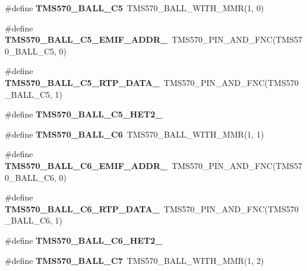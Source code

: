 \begin{DoxyCompactItemize}
\mbox{\label{tms570lc4357-pins_8h_a68cd49c5fae726ad359edde2b38d04a6}} 
\#define {\bfseries T\+M\+S570\+\_\+\+B\+A\+L\+L\+\_\+\+C5}~T\+M\+S570\+\_\+\+B\+A\+L\+L\+\_\+\+W\+I\+T\+H\+\_\+\+M\+MR(1, 0)
\item 
\mbox{\label{tms570lc4357-pins_8h_a28c8b32b66ef366222d24f74ae7975b2}} 
\#define {\bfseries T\+M\+S570\+\_\+\+B\+A\+L\+L\+\_\+\+C5\+\_\+\+E\+M\+I\+F\+\_\+\+A\+D\+D\+R\+\_}~T\+M\+S570\+\_\+\+P\+I\+N\+\_\+\+A\+N\+D\+\_\+\+F\+NC(T\+M\+S570\+\_\+\+B\+A\+L\+L\+\_\+\+C5, 0)
\item 
\mbox{\label{tms570lc4357-pins_8h_a885ec0b43a04a072986ee2cb57c57e17}} 
\#define {\bfseries T\+M\+S570\+\_\+\+B\+A\+L\+L\+\_\+\+C5\+\_\+\+R\+T\+P\+\_\+\+D\+A\+T\+A\+\_}~T\+M\+S570\+\_\+\+P\+I\+N\+\_\+\+A\+N\+D\+\_\+\+F\+NC(T\+M\+S570\+\_\+\+B\+A\+L\+L\+\_\+\+C5, 1)
\item 
\#define {\bfseries T\+M\+S570\+\_\+\+B\+A\+L\+L\+\_\+\+C5\+\_\+\+H\+E\+T2\+\_}
\item 
\mbox{\label{tms570lc4357-pins_8h_a8b858d9ca66ef31be67bfb92802782b2}} 
\#define {\bfseries T\+M\+S570\+\_\+\+B\+A\+L\+L\+\_\+\+C6}~T\+M\+S570\+\_\+\+B\+A\+L\+L\+\_\+\+W\+I\+T\+H\+\_\+\+M\+MR(1, 1)
\item 
\mbox{\label{tms570lc4357-pins_8h_a69b08ad1a9fbc141e3f0e5ff17741058}} 
\#define {\bfseries T\+M\+S570\+\_\+\+B\+A\+L\+L\+\_\+\+C6\+\_\+\+E\+M\+I\+F\+\_\+\+A\+D\+D\+R\+\_}~T\+M\+S570\+\_\+\+P\+I\+N\+\_\+\+A\+N\+D\+\_\+\+F\+NC(T\+M\+S570\+\_\+\+B\+A\+L\+L\+\_\+\+C6, 0)
\item 
\mbox{\label{tms570lc4357-pins_8h_a60500402fbf682187d6538881f28f751}} 
\#define {\bfseries T\+M\+S570\+\_\+\+B\+A\+L\+L\+\_\+\+C6\+\_\+\+R\+T\+P\+\_\+\+D\+A\+T\+A\+\_}~T\+M\+S570\+\_\+\+P\+I\+N\+\_\+\+A\+N\+D\+\_\+\+F\+NC(T\+M\+S570\+\_\+\+B\+A\+L\+L\+\_\+\+C6, 1)
\item 
\#define {\bfseries T\+M\+S570\+\_\+\+B\+A\+L\+L\+\_\+\+C6\+\_\+\+H\+E\+T2\+\_}
\item 
\mbox{\label{tms570lc4357-pins_8h_a0893c3f10f0dd964b0e62d7582b0b1c8}} 
\#define {\bfseries T\+M\+S570\+\_\+\+B\+A\+L\+L\+\_\+\+C7}~T\+M\+S570\+\_\+\+B\+A\+L\+L\+\_\+\+W\+I\+T\+H\+\_\+\+M\+MR(1, 2)

\end{DoxyCompactItemize}
